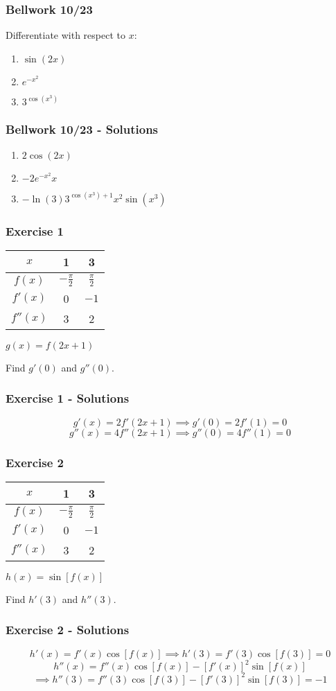 \documentclass[12pt]{beamer}
\begin{document}
\begin{frame}
	\frametitle{Bellwork 10/23}
	\initclock

	\Large
	Differentiate with respect to $x$:\par
	\vfill
	\begin{enumerate}\itemsep2ex
		\item $\sin(2x)$
		\item $e^{-x^2}$
		\item $3^{\cos(x^3)}$
	\end{enumerate}
	\vfill
	\vfill
\end{frame}
\begin{frame}
	\frametitle{Bellwork 10/23 - Solutions}

	\LARGE
	\begin{enumerate}\itemsep2ex
		\item $2\cos(2x)$
		\item $-2e^{-x^2}x$
		\item $-\ln(3)3^{\cos(x^3)+1}x^2\sin(x^3)$
	\end{enumerate}
\end{frame}
\begin{frame}
	\frametitle{Exercise 1}

	\vfill
	\vfill
	\begin{table}[]
		\begin{tabular}{|c||c|c|}\hline
			$x$      & 1            & 3           \\ \hline
			$f(x)$   & $-\frac\pi2$ & $\frac\pi2$ \\ \hline
			$f'(x)$  & 0            & $-1$        \\ \hline
			$f''(x)$ & 3            & 2           \\ \hline
		\end{tabular}\par
		\vfill
		$g(x)=f(2x+1)$\par
		\vfill
		\Large
		Find $g'(0)$ and $g''(0)$.
	\end{table}
	\vfill
\end{frame}
\begin{frame}
	\frametitle{Exercise 1 - Solutions}

	\large
	\[g'(x)=2f'(2x+1)\implies \boxed{g'(0)=2f'(1)=0}\]
	\[g''(x)=4f''(2x+1)\implies \boxed{g''(0)=4f''(1)=0}\]
\end{frame}
\begin{frame}
	\frametitle{Exercise 2}
	\vfill
	\vfill
	\begin{table}[]
		\begin{tabular}{|c||c|c|}\hline
			$x$      & 1            & 3           \\ \hline
			$f(x)$   & $-\frac\pi2$ & $\frac\pi2$ \\ \hline
			$f'(x)$  & 0            & $-1$        \\ \hline
			$f''(x)$ & 3            & 2           \\ \hline
		\end{tabular}\par
		\vfill
		$h(x)=\sin[f(x)]$\par
		\vfill
		\Large
		Find $h'(3)$ and $h''(3)$.
	\end{table}
	\vfill
\end{frame}
\begin{frame}
	\frametitle{Exercise 2 - Solutions}

	\[h'(x)=f'(x)\cos[f(x)]\implies \boxed{h'(3)=f'(3)\cos[f(3)]=0}\]
	\[h''(x)=f''(x)\cos[f(x)]-[f'(x)]^2\sin[f(x)]\]
	\[\implies \boxed{h''(3)=f''(3)\cos[f(3)]-[f'(3)]^2\sin[f(3)]=-1}\]
\end{frame}
\end{document}
